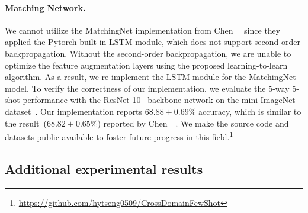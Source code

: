 \paragraph{Matching Network.}
We cannot utilize the MatchingNet implementation from Chen~\etal~\citep{chen2019closerfewshot} since they applied the Pytorch built-in LSTM module, which does not support second-order backpropagation.
Without the second-order backpropagation, we are unable to optimize the feature augmentation layers using the proposed learning-to-learn algorithm.
As a result, we re-implement the LSTM module for the MatchingNet model.
To verify the correctness of our implementation, we evaluate the 5-way 5-shot performance with the ResNet-10~\citep{he2016deep} backbone network on the mini-ImageNet dataset~\citep{ravi2017metalstm}.
Our implementation reports $68.88 \pm 0.69\%$ accuracy, which is similar to the result~(\ie $68.82 \pm 0.65\%$) reported by Chen~\etal~\citep{chen2019closerfewshot}.
We make the source code and datasets public available to foster future progress in this field.\footnote{\url{https://github.com/hytseng0509/CrossDomainFewShot}}

\subsection{Additional experimental results}


